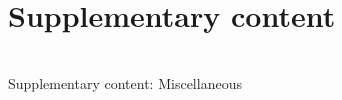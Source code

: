 
\newcommand\design[1]{{\color{design}#1}}
\newcommand\spec[1]{{\color{spec}#1}}
\newcommand\margin[1]{{\color{margin}#1}}
\newcommand\perf[1]{{\color{perf}#1}}
\section{Supplementary content}
\begin{frame}[c,noframenumbering]
	\centering
	\begin{titleblock}{}
		~\\%
		{\centering\LARGE Supplementary content: Miscellaneous\\}%
		~\\%
	\end{titleblock}
\end{frame}
